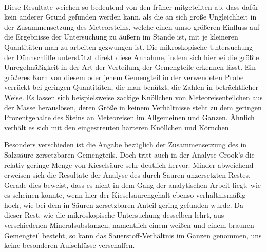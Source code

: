 \documentclass[a4paper, 11pt, oneside]{article}
\begin{document}
\paragraph{}
Diese Resultate weichen so bedeutend von den früher mitgeteilten ab, dass dafür kein anderer Grund gefunden werden kann, als die an sich große Ungleichheit in der Zusammensetzung des Meteorsteins, welche einen umso größeren Einfluss auf die Ergebnisse der Untersuchung zu äußern im Stande ist, mit je kleineren Quantitäten man zu arbeiten gezwungen ist. Die mikroskopische Untersuchung der Dünnschliffe unterstützt direkt diese Annahme, indem sich hierbei die größte Unregelmäßigkeit in der Art der Verteilung der Gemengteile erkennen lässt. Ein größeres Korn von diesem oder jenem Gemengteil in der verwendeten Probe verrückt bei geringen Quantitäten, die man benützt, die Zahlen in beträchtlicher Weise. Es lassen sich beispielsweise zackige Knöllchen von Meteoreisenteilchen aus der Masse herauslösen, deren Größe in keinem Verhältnisse steht zu dem geringen Prozentgehalte des Steins an Meteoreisen im Allgemeinen und Ganzen. Ähnlich verhält es sich mit den eingestreuten härteren Knöllchen und Körnchen.

Besonders verschieden ist die Angabe bezüglich der Zusammensetzung des in Salzsäure zersetzbaren Gemengteils. Doch tritt auch in der Analyse Crook's die relativ geringe Menge von Kieselsäure sehr deutlich hervor. Minder abweichend erweisen sich die Resultate der Analyse des durch Säuren unzersetzten Restes. Gerade dies beweist, dass es nicht in dem Gang der analytischen Arbeit liegt, wie es scheinen könnte, wenn hier der Kieselsäurengehalt ebenso verhältnismäßig hoch, wie bei dem in Säuren zersetzbaren Anteil gering gefunden wurde. Da dieser Rest, wie die mikroskopische Untersuchung desselben lehrt, aus verschiedenen Mineralsubstanzen, namentlich einem weißen und einem braunen Gemengteil besteht, so kann das Sauerstoff-Verhältnis im Ganzen genommen, uns keine besonderen Aufschlüsse verschaffen.
\end{document}
